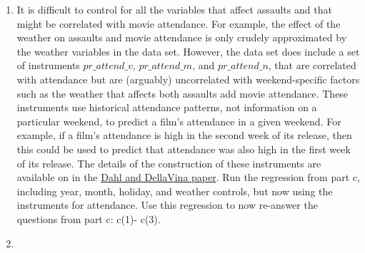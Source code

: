 \documentclass[
]{article}
\providecommand{\tightlist}{%
  \setlength{\itemsep}{0pt}\setlength{\parskip}{0pt}}
\begin{document}
\begin{enumerate}
\begin{enumerate}
    \begin{enumerate}
    \def\labelenumiii{\arabic{enumiii}.}
    \tightlist
    \item
      Based on the regression, does viewing a strongly violent movie
      increase or decrease assaults? By how much? Is the estimated
      affect statistically significant?
    \item
      Does attendance at strongly violent movies affect us all
      differently than attendance at moderately violent movies?
      Differently than attendance at non-violent movies?
    \item
      A strongly violent blockbuster movie is released and the weekends
      attendance is at strongly violent movies increases by 6 million;
      meanwhile, attendance falls by 2 million for moderately violent
      movies and by 1 million for non-violent movies. What is the
      predicted effect on assault? Construct a 95\% confidence interval
      for the change in assault.\footnote{\emph{Hint:} Review section
        7.3 and material surrounding equations 8.7 and 8.8}
    \end{enumerate}
  \item
    It is difficult to control for all the variables that affect
    assaults and that might be correlated with movie attendance. For
    example, the effect of the weather on assaults and movie attendance
    is only crudely approximated by the weather variables in the data
    set. However, the data set does include a set of instruments
    \(pr\_attend\_v\), \(pr\_attend\_m\), and \(pr\_attend\_n\), that
    are correlated with attendance but are (arguably) uncorrelated with
    weekend-specific factors such as the weather that affects both
    assaults add movie attendance. These instruments use historical
    attendance patterns, not information on a particular weekend, to
    predict a film's attendance in a given weekend. For example, if a
    film's attendance is high in the second week of its release, then
    this could be used to predict that attendance was also high in the
    first week of its release. The details of the construction of these
    instruments are available on in the
    \href{https://eml.berkeley.edu//~sdellavi/wp/moviescrime08-08-01Forthc.pdf}{Dahl
    and DellaVina paper}. Run the regression from part c, including
    year, month, holiday, and weather controls, but now using the
    instruments for attendance. Use this regression to now re-answer the
    questions from part c: c(1)- c(3).
  \item

\end{enumerate}
\end{enumerate}
\end{document}
